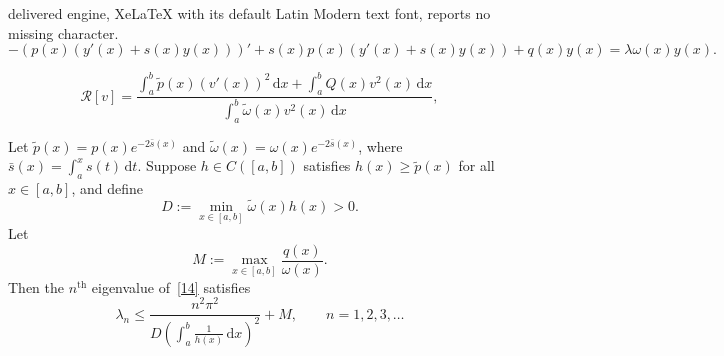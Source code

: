 \documentclass[10pt,a4paper]{amsart}
\begin{document}
delivered engine, XeLaTeX with its default Latin Modern text font, reports no missing character.
\begin{equation} \label{14}
-\left(p(x)\left(y'(x) + s(x)y(x)\right)\right)' + s(x)p(x)\left(y'(x) + s(x)y(x)\right) + q(x)y(x) = \lambda \omega(x)y(x).
\end{equation}

\begin{equation}\label{RayleightQuotient}
\mathcal{R}[v] = \frac{\displaystyle\int_a^b \tilde{p}(x)(v'(x))^2\,\mathrm{d}x + \int_a^b Q(x)v^2(x)\,\mathrm{d}x}{\displaystyle\int_a^b \tilde{\omega}(x)v^2(x)\,\mathrm{d}x},
\end{equation}

\begin{theorem}
\label{th:upper-bound}
Let $\tilde{p}(x) = p(x)e^{-2\bar{s}(x)}$ and $\tilde{\omega}(x) = \omega(x)e^{-2\bar{s}(x)}$, where $\bar{s}(x) = \int_a^x s(t)\,\mathrm{d}t$. Suppose $h \in C([a,b])$ satisfies $h(x) \geq \tilde{p}(x)$ for all $x \in [a,b]$, and define
\[
D := \min_{x \in [a,b]} \tilde{\omega}(x)h(x) > 0.
\]
Let
\[
M := \max_{x \in [a,b]} \frac{q(x)}{\omega(x)}.
\]
Then the $n^{\text{th}}$ eigenvalue of~\eqref{14} satisfies
\[
\lambda_n \leq \frac{n^2\pi^2}{D\left(\displaystyle\int_a^b \frac{1}{h(x)}\,\mathrm{d}x\right)^2} + M, \qquad n = 1, 2, 3, \ldots
\]
\end{theorem}
\end{document}
